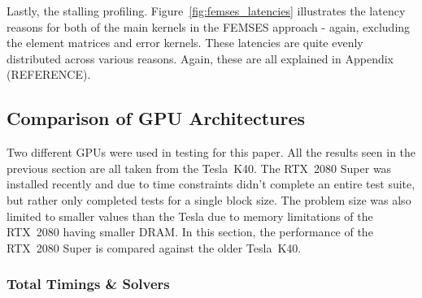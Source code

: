 Lastly, the stalling profiling. Figure~\ref{fig:femses_latencies} illustrates the latency reasons for both of the main kernels in the FEMSES approach - again, excluding the element matrices and error kernels. These latencies are quite evenly distributed across various reasons. Again, these are all explained in Appendix (REFERENCE).

\subsection{Comparison of GPU Architectures}

Two different GPUs were used in testing for this paper. All the results seen in the previous section are all taken from the Tesla~K40. The RTX~2080 Super was installed recently and due to time constraints didn't complete an entire test suite, but rather only completed tests for a single block size. The problem size was also limited to smaller values than the Tesla due to memory limitations of the RTX~2080 having smaller DRAM. In this section, the performance of the RTX~2080 Super is compared against the older Tesla~K40.

\subsubsection{Total Timings \& Solvers}

